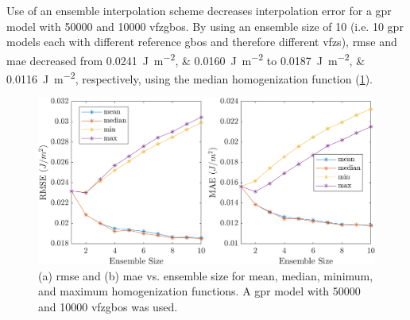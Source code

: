 \documentclass[preprint,12pt]{elsarticle}
\begin{document}
Use of an ensemble interpolation scheme decreases interpolation error for a \gls{gpr} model with \num{50000} \inpt{} and \num{10000} \outpt{} \glspl{vfzgbo}. By using an ensemble size of 10 (i.e. 10 \gls{gpr} models each with different reference \glspl{gbo} and therefore different \glspl{vfz}), \gls{rmse} and \gls{mae} decreased from \SIlist{0.0241;0.0160}{\J\per\square\m} to \SIlist{0.0187;0.0116}{\J\per\square\m}, respectively, using the median homogenization function (\cref{fig:ensemble-interp-rmse-mae}). 
\begin{figure}
    \centering
    \includegraphics[scale=1]{figures/ensemble-interp-rmse-mae.png}
    \caption{(a) \Gls{rmse} and (b) \gls{mae} vs. ensemble size for mean, median, minimum, and maximum homogenization functions. A \gls{gpr} model with \num{50000} \inpt{} and \num{10000} \outpt{} \glspl{vfzgbo} was used. }
    \label{fig:ensemble-interp-rmse-mae}
\end{figure}
\end{document}
